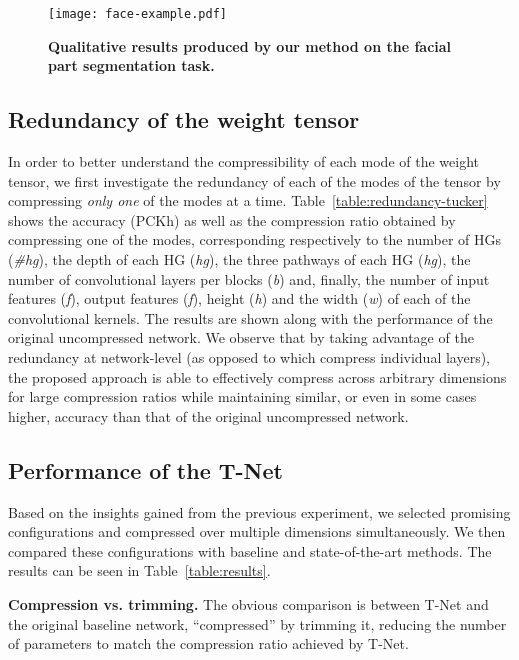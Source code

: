 \documentclass[10pt,twocolumn,letterpaper]{article}
\begin{document}
\begin{figure*}[t]
    \centering
    \texttt{[image: face-example.pdf]}
    \caption{\textbf{Qualitative results produced by our method on the facial part segmentation task.}}
    \label{fig:face-parsing-example}
\end{figure*}

\subsection{Redundancy of the weight tensor}
In order to better understand the compressibility of each mode of the weight tensor, we first investigate the redundancy of each of the modes of the tensor by compressing \emph{only one} of the modes at a time. Table~\ref{table:redundancy-tucker} shows the accuracy (PCKh) as well as the compression ratio obtained by compressing one of the modes, corresponding respectively to the number of HGs (\emph{\#hg}), the depth of each HG (\emph{hg}), the three pathways of each HG (\emph{hg}), the number of convolutional layers per blocks (\emph{b}) and, finally, the number of input features (\emph{f}), output features (\emph{f}), height (\emph{h}) and the width (\emph{w}) of each of the convolutional kernels. The results are shown along with the performance of the original uncompressed network. We observe that by taking advantage of the redundancy at network-level (as opposed to \cite{lebedev2014speeding, yong2015compression} which compress individual layers), the proposed approach is able to effectively compress across arbitrary dimensions for large compression ratios while maintaining similar, or even in some cases higher, accuracy than that of the original uncompressed network.

\subsection{Performance of the T-Net}
Based on the insights gained from the previous experiment, we selected promising configurations and compressed over multiple dimensions simultaneously. We then compared these configurations with baseline and state-of-the-art methods. The results can be seen in Table~\ref{table:results}. 

\textbf{Compression vs. trimming.} The obvious comparison is between T-Net and the original baseline network, ``compressed'' by trimming it, reducing the number of parameters to match the compression ratio achieved by T-Net.
\end{document}
